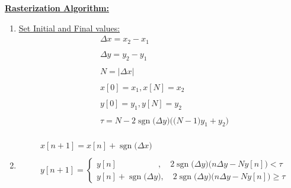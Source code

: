 \documentclass{article}
\DeclareMathOperator{\sgn}{sgn}
\begin{document}
\underline{\textbf{Rasterization Algorithm:}} \\
\begin{enumerate}
    \item \underline{Set Initial and Final values:}
           \begin{align*}
                &\Delta x = x_{2} - x_{1} \\ \\
                &\Delta y = y_{2} - y_{1} \\ \\
                &N = |\Delta x| \\ \\  
                &x[0] = x_{1}, x[N] = x_{2} \\ \\
                &y[0] = y_{1}, y[N] = y_{2} \\ \\ 
                &\tau = N - 2\sgn\big(\Delta y\big)\bigg(\big(N - 1\big)y_{1} + y_{2}\bigg) \\ 
             \end{align*}
    \item {} 
           \begin{align*}
                &x[n + 1] = x[n] + \sgn\big(\Delta x\big) \\ \\ 
                &y[n + 1] = \begin{cases}
                                y[n] \quad \quad \quad \quad \quad, \quad 2\sgn\big(\Delta y\big)\Bigg(n\Delta y - Ny[n] \Bigg) < \tau \\
                                y[n] + \sgn\big(\Delta y\big), \quad 2\sgn\big(\Delta y\big)\Bigg(n\Delta y - Ny[n] \Bigg) \geq \tau
                              \end{cases} \\ \\ 
            \end{align*}
\end{enumerate}
\end{document}
